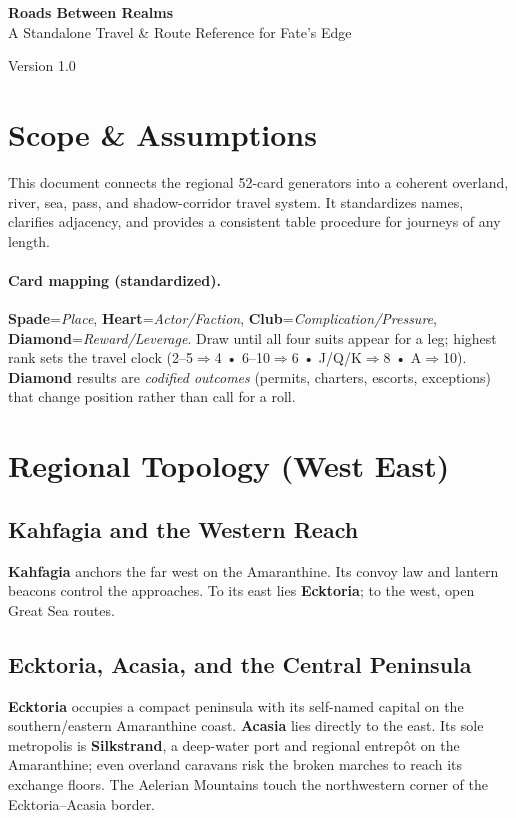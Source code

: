 \documentclass[11pt]{article}
\newcommand{\SuitSpade}{\textbf{Spade}} %
\newcommand{\SuitHeart}{\textbf{Heart}} %
\newcommand{\SuitClub}{\textbf{Club}}   %
\newcommand{\SuitDiamond}{\textbf{Diamond}} %
\newcommand{\ClockSizes}{2--5$\Rightarrow$4 • 6--10$\Rightarrow$6 • J/Q/K$\Rightarrow$8 • A$\Rightarrow$10}
\begin{document}
\begin{center}
{\LARGE \textbf{Roads Between Realms}}\\[4pt]
{\large A Standalone Travel & Route Reference for Fate's Edge}\par
\vspace{4pt}\small Version 1.0
\end{center}

\tableofcontents
\vspace{6pt}

\section{Scope & Assumptions}
This document connects the regional 52-card generators into a coherent overland, river, sea, pass, and shadow-corridor travel system. It standardizes names, clarifies adjacency, and provides a consistent table procedure for journeys of any length.

\paragraph{Card mapping (standardized).} \SuitSpade{}=\emph{Place}, \SuitHeart{}=\emph{Actor/Faction}, \SuitClub{}=\emph{Complication/Pressure}, \SuitDiamond{}=\emph{Reward/Leverage}. Draw until all four suits appear for a leg; highest rank sets the travel clock (\ClockSizes). \SuitDiamond{} results are \emph{codified outcomes} (permits, charters, escorts, exceptions) that change position rather than call for a roll.

\section{Regional Topology (West \textrightarrow{} East)}
\subsection*{Kahfagia and the Western Reach}
\textbf{Kahfagia} anchors the far west on the Amaranthine. Its convoy law and lantern beacons control the approaches. To its east lies \textbf{Ecktoria}; to the west, open Great Sea routes.

\subsection*{Ecktoria, Acasia, and the Central Peninsula}
\textbf{Ecktoria} occupies a compact peninsula with its self-named capital on the southern/eastern Amaranthine coast. \textbf{Acasia} lies directly to the east. Its sole metropolis is \textbf{Silkstrand}, a deep-water port and regional entrep\^ot on the Amaranthine; even overland caravans risk the broken marches to reach its exchange floors. The Aelerian Mountains touch the northwestern corner of the Ecktoria--Acasia border.
\end{document}
